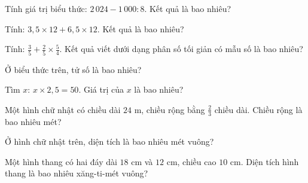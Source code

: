
\begin{ex}
  Tính giá trị biểu thức: $2\,024 - 1\,000 : 8$. Kết quả là bao nhiêu?
\end{ex}

\begin{ex}
  Tính: $3{,}5 \times 12 + 6{,}5 \times 12$. Kết quả là bao nhiêu?
\end{ex}

\begin{ex}
  Tính: $\frac{3}{5} + \frac{2}{5} \times \frac{5}{4}$. Kết quả viết dưới dạng phân số tối giản có mẫu số là bao nhiêu?
\end{ex}

\begin{ex}
  Ở biểu thức trên, tử số là bao nhiêu?
\end{ex}

\begin{ex}
  Tìm $x$: $x \times 2{,}5 = 50$. Giá trị của $x$ là bao nhiêu?
\end{ex}

\begin{ex}
  Một hình chữ nhật có chiều dài $24\text{ m}$, chiều rộng bằng $\frac{2}{3}$ chiều dài. Chiều rộng là bao nhiêu mét?
\end{ex}

\begin{ex}
  Ở hình chữ nhật trên, diện tích là bao nhiêu mét vuông?
\end{ex}

\begin{ex}
  Một hình thang có hai đáy dài $18\text{ cm}$ và $12\text{ cm}$, chiều cao $10\text{ cm}$. Diện tích hình thang là bao nhiêu xăng-ti-mét vuông?
\end{ex}

